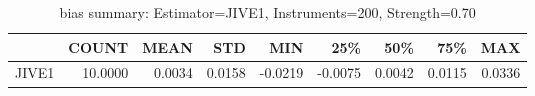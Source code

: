 \begin{table}[ht]
\centering
\caption{bias summary: Estimator=JIVE1, Instruments=200, Strength=0.70}
\begin{tabular}{lrrrrrrrr}
\toprule
 & COUNT & MEAN & STD & MIN & 25\% & 50\% & 75\% & MAX \\
\midrule
JIVE1 & 10.0000 & 0.0034 & 0.0158 & -0.0219 & -0.0075 & 0.0042 & 0.0115 & 0.0336 \\
\bottomrule
\end{tabular}
\end{table}
